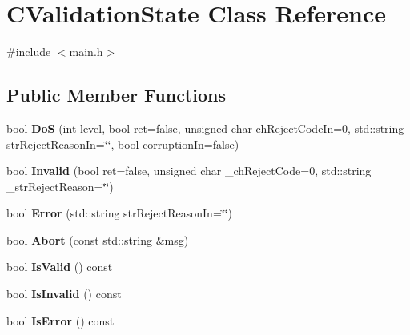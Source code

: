 \hypertarget{class_c_validation_state}{}\section{C\+Validation\+State Class Reference}
\label{class_c_validation_state}


{\ttfamily \#include $<$main.\+h$>$}

\subsection*{Public Member Functions}
\begin{DoxyCompactItemize}
\item 
\mbox{\label{class_c_validation_state_a3c6786d00da8d1c5df25b4c3876409e8}} 
bool {\bfseries DoS} (int level, bool ret=false, unsigned char ch\+Reject\+Code\+In=0, std\+::string str\+Reject\+Reason\+In=\char`\"{}\char`\"{}, bool corruption\+In=false)
\item 
\mbox{\label{class_c_validation_state_a88ff08b67f7f44bb3c7f7053bb1ee6fc}} 
bool {\bfseries Invalid} (bool ret=false, unsigned char \+\_\+ch\+Reject\+Code=0, std\+::string \+\_\+str\+Reject\+Reason=\char`\"{}\char`\"{})
\item 
\mbox{\label{class_c_validation_state_abf67ad56f62df5679d47c289684c554c}} 
bool {\bfseries Error} (std\+::string str\+Reject\+Reason\+In=\char`\"{}\char`\"{})
\item 
\mbox{\label{class_c_validation_state_a6788cb521cf538ac80413a1c6c3da5e8}} 
bool {\bfseries Abort} (const std\+::string \&msg)
\item 
\mbox{\label{class_c_validation_state_a7dc31c88ba63ad17a954f247d21b550c}} 
bool {\bfseries Is\+Valid} () const
\item 
\mbox{\label{class_c_validation_state_ace1d536f4003d3a6689fccd0f496c977}} 
bool {\bfseries Is\+Invalid} () const
\item 
\mbox{\label{class_c_validation_state_aeac85935d695254422bc5f2db8a5516b}} 
bool {\bfseries Is\+Error} () const

\end{DoxyCompactItemize}
